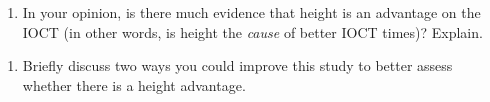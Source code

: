 \documentclass[
]{book}
\providecommand{\tightlist}{%
  \setlength{\itemsep}{0pt}\setlength{\parskip}{0pt}}
\begin{document}
\vspace{1in}

\newpage

\begin{enumerate}
\def\labelenumi{\arabic{enumi}.}
\setcounter{enumi}{14}
\tightlist
\item
  In your opinion, is there much evidence that height is an advantage on the IOCT (in other words, is height the \emph{cause} of better IOCT times)? Explain.
\end{enumerate}

\vspace{2in}

\begin{enumerate}
\def\labelenumi{\arabic{enumi}.}
\setcounter{enumi}{15}
\tightlist
\item
  Briefly discuss two ways you could improve this study to better assess whether there is a height advantage.
\end{enumerate}

\vspace{1in}

  
\end{document}
